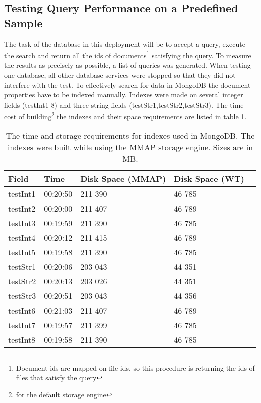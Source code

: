 \subsection{Testing Query Performance on a Predefined Sample}

The task of the database in this deployment will be to accept a query, execute the search and return all the 
ids of documents\footnote{Document ids are mapped on file ids, so this procedure is returning the ids of files
that satisfy the query} satisfying the query. To measure the results as precisely as possible, a list of
queries was generated. When testing one database, all other database services were stopped so that they did not
interfere with the test. To effectively search for data in MongoDB the document properties have to be 
indexed manually. Indexes were made on several integer fields (testInt1-8) and three string fields 
(testStr1,testStr2,testStr3). The time cost of building\footnote{for the default storage engine} the 
indexes and their space requirements are listed in table \ref{tab:indexBuildTimes}.

\begin{table}[h]
\centering
\begin{tabular}{|l|l|l|l|l|}
\hline
Field    & Time     & Disk Space (MMAP) & Disk Space (WT) \\ \hline
testInt1 & 00:20:50 & 211 390           & 46 785          \\ \hline
testInt2 & 00:20:00 & 211 407           & 46 789          \\ \hline
testInt3 & 00:19:59 & 211 390           & 46 785          \\ \hline
testInt4 & 00:20:12 & 211 415           & 46 789          \\ \hline
testInt5 & 00:19:58 & 211 390           & 46 785          \\ \hline
testStr1 & 00:20:06 & 203 043           & 44 351          \\ \hline
testStr2 & 00:20:13 & 203 026           & 44 351          \\ \hline
testStr3 & 00:20:51 & 203 043           & 44 356          \\ \hline
testInt6 & 00:21:03 & 211 407           & 46 789          \\ \hline
testInt7 & 00:19:57 & 211 399           & 46 785          \\ \hline
testInt8 & 00:19:58 & 211 390           & 46 785          \\ \hline
\end{tabular}
\caption{The time and storage requirements for indexes used in MongoDB. The indexes were built while using
the MMAP storage engine. Sizes are in MB.}
\label{tab:indexBuildTimes}
\end{table}

